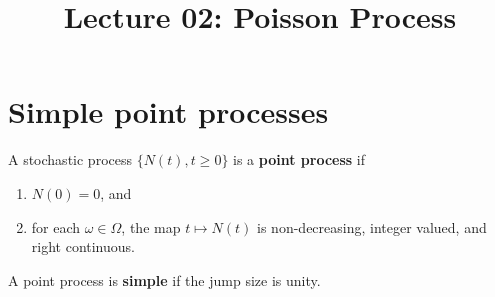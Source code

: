 \documentclass[a4paper,10pt,english]{article}
\title{Lecture 02: Poisson Process}
\author{}
\begin{document}
\maketitle

\section{Simple point processes}
A stochastic process $\{N(t), t\geqslant 0\}$ is a \textbf{point process} if
\begin{enumerate}
  \item $N(0) = 0$, and 
  \item for each $\omega \in \Omega$, the map $t\mapsto N(t)$ is non-decreasing, integer valued, and right continuous.%
\end{enumerate}
A point process is \textbf{simple} if the jump size is unity.
\end{document}
